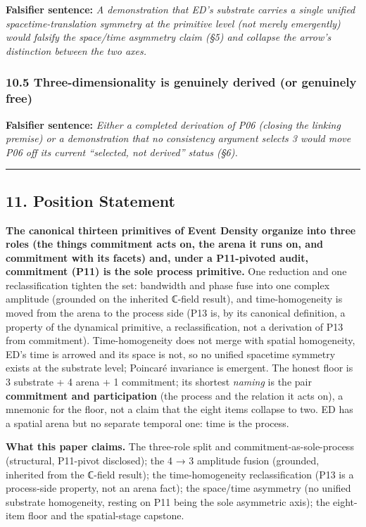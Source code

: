 \documentclass[
  11pt,
]{article}
\begin{document}
\textbf{Falsifier sentence:} \emph{A demonstration that ED's substrate
carries a single unified spacetime-translation symmetry at the primitive
level (not merely emergently) would falsify the space/time asymmetry
claim (§5) and collapse the arrow's distinction between the two axes.}

\subsubsection{10.5 Three-dimensionality is genuinely derived (or
genuinely
free)}\label{three-dimensionality-is-genuinely-derived-or-genuinely-free}

\textbf{Falsifier sentence:} \emph{Either a completed derivation of P06
(closing the linking premise) or a demonstration that no consistency
argument selects 3 would move P06 off its current ``selected, not
derived'' status (§6).}

\begin{center}\rule{0.5\linewidth}{0.5pt}\end{center}

\subsection{11. Position Statement}\label{position-statement}

\textbf{The canonical thirteen primitives of Event Density organize into
three roles (the things commitment acts on, the arena it runs on, and
commitment with its facets) and, under a P11-pivoted audit, commitment
(P11) is the sole process primitive.} One reduction and one
reclassification tighten the set: bandwidth and phase fuse into one
complex amplitude (grounded on the inherited ℂ-field result), and
time-homogeneity is moved from the arena to the process side (P13 is, by
its canonical definition, a property of the dynamical primitive, a
reclassification, not a derivation of P13 from commitment).
Time-homogeneity does not merge with spatial homogeneity, ED's time is
arrowed and its space is not, so no unified spacetime symmetry exists at
the substrate level; Poincaré invariance is emergent. The honest floor
is 3 substrate + 4 arena + 1 commitment; its shortest \emph{naming} is
the pair \textbf{commitment and participation} (the process and the
relation it acts on), a mnemonic for the floor, not a claim that the
eight items collapse to two. ED has a spatial arena but no separate
temporal one: time is the process.

\textbf{What this paper claims.} The three-role split and
commitment-as-sole-process (structural, P11-pivot disclosed); the 4 → 3
amplitude fusion (grounded, inherited from the ℂ-field result); the
time-homogeneity reclassification (P13 is a process-side property, not
an arena fact); the space/time asymmetry (no unified substrate
homogeneity, resting on P11 being the sole asymmetric axis); the
eight-item floor and the spatial-stage capstone.
\end{document}
